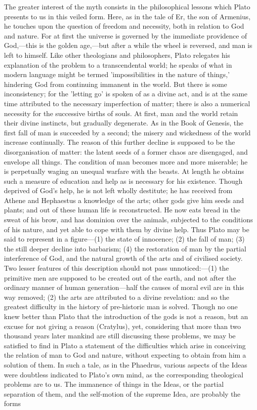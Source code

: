 \documentclass[11pt,letter]{article}
\begin{document}
\par  The greater interest of the myth consists in the philosophical lessons which Plato presents to us in this veiled form. Here, as in the tale of Er, the son of Armenius, he touches upon the question of freedom and necessity, both in relation to God and nature. For at first the universe is governed by the immediate providence of God,—this is the golden age,—but after a while the wheel is reversed, and man is left to himself. Like other theologians and philosophers, Plato relegates his explanation of the problem to a transcendental world; he speaks of what in modern language might be termed 'impossibilities in the nature of things,' hindering God from continuing immanent in the world. But there is some inconsistency; for the 'letting go' is spoken of as a divine act, and is at the same time attributed to the necessary imperfection of matter; there is also a numerical necessity for the successive births of souls. At first, man and the world retain their divine instincts, but gradually degenerate. As in the Book of Genesis, the first fall of man is succeeded by a second; the misery and wickedness of the world increase continually. The reason of this further decline is supposed to be the disorganisation of matter: the latent seeds of a former chaos are disengaged, and envelope all things. The condition of man becomes more and more miserable; he is perpetually waging an unequal warfare with the beasts. At length he obtains such a measure of education and help as is necessary for his existence. Though deprived of God's help, he is not left wholly destitute; he has received from Athene and Hephaestus a knowledge of the arts; other gods give him seeds and plants; and out of these human life is reconstructed. He now eats bread in the sweat of his brow, and has dominion over the animals, subjected to the conditions of his nature, and yet able to cope with them by divine help. Thus Plato may be said to represent in a figure—(1) the state of innocence; (2) the fall of man; (3) the still deeper decline into barbarism; (4) the restoration of man by the partial interference of God, and the natural growth of the arts and of civilised society. Two lesser features of this description should not pass unnoticed:—(1) the primitive men are supposed to be created out of the earth, and not after the ordinary manner of human generation—half the causes of moral evil are in this way removed; (2) the arts are attributed to a divine revelation: and so the greatest difficulty in the history of pre-historic man is solved. Though no one knew better than Plato that the introduction of the gods is not a reason, but an excuse for not giving a reason (Cratylus), yet, considering that more than two thousand years later mankind are still discussing these problems, we may be satisfied to find in Plato a statement of the difficulties which arise in conceiving the relation of man to God and nature, without expecting to obtain from him a solution of them. In such a tale, as in the Phaedrus, various aspects of the Ideas were doubtless indicated to Plato's own mind, as the corresponding theological problems are to us. The immanence of things in the Ideas, or the partial separation of them, and the self-motion of the supreme Idea, are probably the forms 
\end{document}
